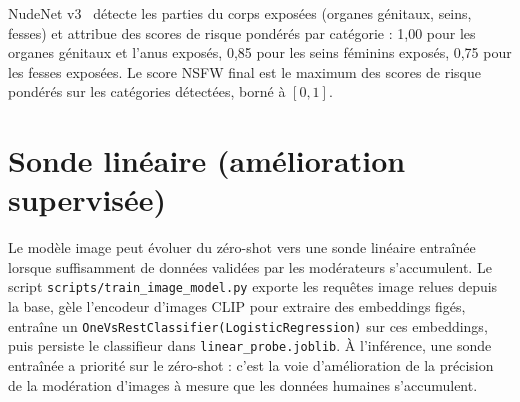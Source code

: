 NudeNet v3~\cite{nudenet2023} détecte les parties du corps exposées (organes génitaux, seins, fesses) et attribue des scores de risque pondérés par catégorie : 1,00 pour les organes génitaux et l'anus exposés, 0,85 pour les seins féminins exposés, 0,75 pour les fesses exposées. Le score NSFW final est le maximum des scores de risque pondérés sur les catégories détectées, borné à $[0, 1]$.

\section{Sonde linéaire (amélioration supervisée)}

Le modèle image peut évoluer du zéro-shot vers une sonde linéaire entraînée lorsque suffisamment de données validées par les modérateurs s'accumulent. Le script \texttt{scripts/train\_image\_model.py} exporte les requêtes image relues depuis la base, gèle l'encodeur d'images CLIP pour extraire des embeddings figés, entraîne un \texttt{OneVsRestClassifier(LogisticRegression)} sur ces embeddings, puis persiste le classifieur dans \texttt{linear\_probe.joblib}. À l'inférence, une sonde entraînée a priorité sur le zéro-shot : c'est la voie d'amélioration de la précision de la modération d'images à mesure que les données humaines s'accumulent.
